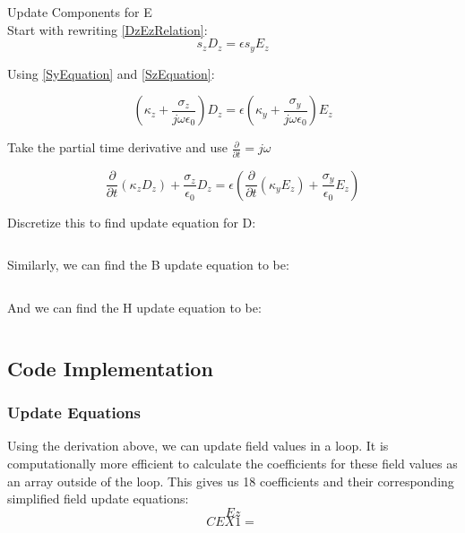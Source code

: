 \documentclass{article}
\begin{document}
 
 Update Components for E\\

 Start with rewriting \ref{DzEzRelation}:
 \begin{equation}s_{z}D_{z}=\epsilon s_{y}E_{z}\end{equation}

 Using \ref{SyEquation} and \ref{SzEquation}:

 \begin{equation}(\kappa_{z}+\frac{\sigma_{z}}{j\omega\epsilon_{0}})D_{z}=\epsilon
   (\kappa_{y}+\frac{\sigma_{y}}{j\omega\epsilon_{0}})E_{z}\end{equation}

 Take the partial time derivative and use $\frac{\partial}{\partial t}= j \omega$
 
 \begin{equation}
   \frac{\partial}{\partial t}(\kappa_{z}D_{z})+\frac{\sigma_{z}}{\epsilon_{0}}D_{z}=
   \epsilon(\frac{\partial}{\partial t}(\kappa_{y}E_{z})+\frac{\sigma_{y}}{\epsilon_{0}}E_{z})
 \end{equation}

 Discretize this to find update equation for D:

 \begin{equation}

 \end{equation}
 
 Similarly, we can find the B update equation to be:

 \begin{equation}

 \end{equation}

 And we can find the H update equation to be:

 \begin{equation}

 \end{equation}

\subsection{Code Implementation}
\subsubsection{Update Equations}
 Using the derivation above, we can update field values in a loop. It is
 computationally more efficient to calculate the coefficients for these field
 values as an array outside of the loop. This gives us 18 coefficients and their
 corresponding simplified field update equations:
 \begin{equation}
   Ez
 \end{equation}
 \begin{equation}
   CEX1=\frac{}{}
 \end{equation}
\end{document}
